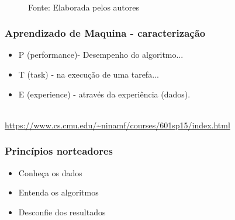 \documentclass[11pt, aspectratio=169]{beamer}
\begin{document}
\begin{frame}
\begin{figure}[ht]
\begin{minipage}[b]{0.45\linewidth}
      \\{\footnotesize Fonte: Elaborada pelos autores}
      \label{fig:diag_ml}
    \end{minipage}
  \end{figure}
\end{frame}



\begin{frame}
  \frametitle{Aprendizado de Maquina - caracterização}


  \begin{Large}
    \begin{center}
      \begin{itemize}
        \item P (performance)- Desempenho do algoritmo...
        \item T (task) - na execução de uma tarefa...
        \item E (experience) - através da experiência (dados).
      \end{itemize}
    \end{center}
  \end{Large}
  \cite{mitchell1997}\\
  \url{https://www.cs.cmu.edu/~ninamf/courses/601sp15/index.html}

\end{frame}


\begin{frame}
  \frametitle{Princípios norteadores}

  \begin{Large}
    \begin{center}
      \begin{itemize}
        \item Conheça os dados
        \item Entenda os algoritmos
        \item Desconfie dos resultados
      \end{itemize}
    \end{center}
  \end{Large}

\end{frame}
\end{document}
